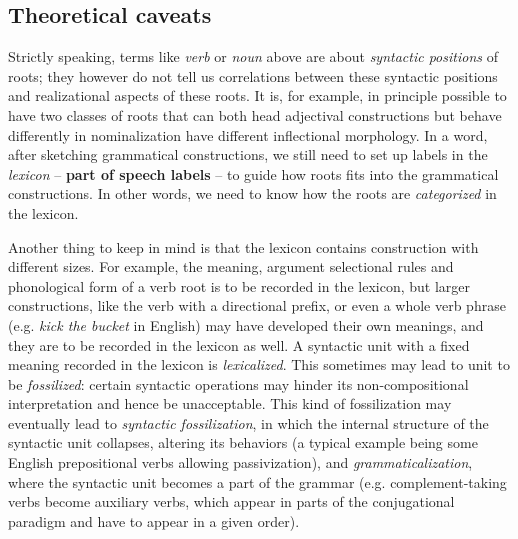\documentclass[a4paper, oneside, 12pt]{report}
\newcommand*{\concept}[1]{\textbf{#1}}
\newcommand*{\term}[1]{\emph{#1}}
\newcommand{\form}[1]{\emph{#1}}
\begin{document}
\subsection{Theoretical caveats}

Strictly speaking, terms like \term{verb} or \term{noun} above
are about \emph{syntactic positions} of roots;
they however do not tell us correlations between these syntactic positions
and realizational aspects of these roots.
It is, for example, in principle possible to have two classes of roots 
that can both head adjectival constructions
but behave differently in nominalization 
have different inflectional morphology.
In a word, after sketching grammatical constructions, 
we still need to set up labels in the \emph{lexicon} -- \concept{part of speech labels} --
to guide how roots fits into the grammatical constructions.
In other words, we need to know how the roots are \emph{categorized} in the lexicon.

Another thing to keep in mind is that the lexicon contains
construction with different sizes.
For example, the meaning, argument selectional rules and phonological form of a verb root
is to be recorded in the lexicon,
but larger constructions, like the verb with a directional prefix,
or even a whole verb phrase (e.g. \form{kick the bucket} in English)
may have developed their own meanings,
and they are to be recorded in the lexicon as well.
A syntactic unit with a fixed meaning recorded in the lexicon is \emph{lexicalized}.
This sometimes may lead to unit to be \emph{fossilized}:
certain syntactic operations may hinder its non-compositional interpretation 
and hence be unacceptable.
This kind of fossilization may eventually lead to \emph{syntactic fossilization},
in which the internal structure of the syntactic unit collapses,
altering its behaviors
(a typical example being some English prepositional verbs allowing passivization),
and \emph{grammaticalization},
where the syntactic unit becomes a part of the grammar 
(e.g. complement-taking verbs become auxiliary verbs,
which appear in parts of the conjugational paradigm and have to appear in a given order).
\end{document}
